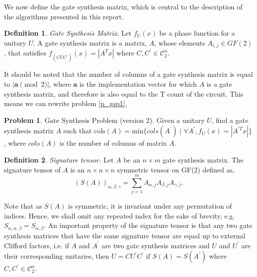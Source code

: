 \documentclass{article}
\theoremstyle{definition}
\newtheorem{definition}{Definition}[section]
\theoremstyle{problem}
\newtheorem{problem}{Problem}[section]
\theoremstyle{lemma}
\begin{document}

	We now define the gate synthesis matrix, which is central to the description of the algorithms presented in this report.
	\theoremstyle{definition}
	\begin{definition}{\emph{Gate Synthesis Matrix}.}
		Let $f_U(x)$ be a phase function for a unitary $U$. A gate synthesis matrix is a matrix, $A$, whose elements $A_{i,j} \in GF(2)$, that satisfies $f_{(CUC^\prime)}(x) = |A^Tx|$ where $C,C^\prime \in \mathcal{C}_2^n$.
	\end{definition}
	It should be noted that the number of columns of a gate synthesis matrix is equal to $|\mathbf{a} \pmod{2}|$, where $\mathbf{a}$ is the implementation vector for which $A$ is a gate synthesis matrix, and therefore is also equal to the T count of the circuit. This means we can rewrite problem \ref{p_gsp1},
	\theoremstyle{problem}
	\begin{problem}{Gate Synthesis Problem (version 2).}
		Given a unitary $U$, find a gate synthesis matrix $A$ such that $\text{cols}(A) = \text{min}\{cols(A^\prime) \mid \forall A^\prime, f_U(x) = |A^{\prime T}x|\}$, where $cols(A)$ is the number of columns of matrix $A$.
	\end{problem}

	\theoremstyle{definition}
	\begin{definition}{\emph{Signature tensor.}}
		Let $A$ be an $n \times m$ gate synthesis matrix. The signature tensor of $A$ is an $n \times n \times n$ symmetric tensor on GF(2) defined as,
		\begin{equation}
		\label{e_Sig}
		\left(S(A)\right)_{\alpha,\beta,\gamma} = \sum_{j = 1}^{m}A_{\alpha,j}A_{\beta,j}A_{\gamma,j}.
		\end{equation}
	\end{definition}		 
	Note that as $S(A)$ is symmetric, it is invariant under any permutation of indices. Hence, we shall omit any repeated index for the sake of brevity, e.g. $S_{\alpha, \alpha, \beta} = S_{\alpha,\beta}$. An important property of the signature tensor is that any two gate synthesis matrices that have the same signature tensor are equal up to external Clifford factors, i.e. if $A$ and $A^\prime$ are two gate synthesis matrices and $U$ and $U^\prime$ are their corresponding unitaries, then $U = CU^\prime C^\prime$ if $S(A)=S(A^\prime)$ where $C,C^\prime \in \mathcal{C}_2^n$.
	
\end{document}
